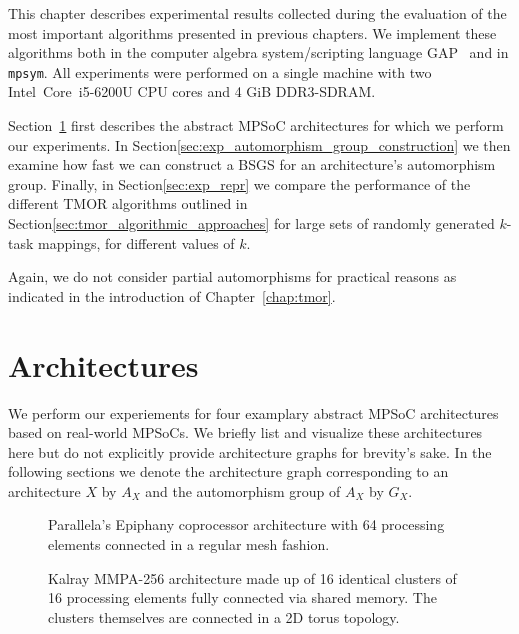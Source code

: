This chapter describes experimental results collected during the evaluation of
the most important algorithms presented in previous chapters.  We implement
these algorithms both in the computer algebra system/scripting language
GAP~\cite{GAP4} and in \texttt{mpsym}. All experiments were performed on a
single machine with two Intel\textregistered\ Core\texttrademark\ i5-6200U CPU
cores and 4 GiB DDR3-SDRAM.

Section~\ref{sec:exp_mpsoc_architectures} first describes the abstract MPSoC
architectures for which we perform our experiments. In
Section\ref{sec:exp_automorphism_group_construction} we then examine how fast
we can construct a BSGS for an architecture's automorphism group. Finally, in
Section\ref{sec:exp_repr} we compare the performance of the different TMOR
algorithms outlined in Section\ref{sec:tmor_algorithmic_approaches} for large
sets of randomly generated $k$-task mappings, for different values of $k$.

Again, we do not consider partial automorphisms for practical reasons as
indicated in the introduction of Chapter~\ref{chap:tmor}.

\section{Architectures}
\label{sec:exp_mpsoc_architectures}

We perform our experiements for four examplary abstract MPSoC architectures
based on real-world MPSoCs. We briefly list and visualize these architectures
here but do not explicitly provide architecture graphs for brevity's sake.  In
the following sections we denote the architecture graph corresponding to an
architecture $X$ by $A_X$ and the automorphism group of $A_X$ by $G_X$.

\begin{figure}
  \centering
  \caption{Parallela's Epiphany coprocessor architecture with 64 processing
           elements connected in a regular mesh fashion.}
  \label{fig:parallella}
\end{figure}

\begin{figure}
  \centering
  \caption{Kalray MMPA-256 architecture made up of 16 identical clusters of 16
           processing elements fully connected via shared memory. The clusters
           themselves are connected in a 2D torus topology.}
  \label{fig:kalray}
\end{figure}

